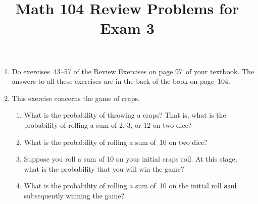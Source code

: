 \documentclass[12pt]{article}
\author{}\date{}
\title{Math 104 Review Problems for Exam 3}\author{}
\begin{document}
\maketitle
\pagestyle{empty}
\begin{enumerate}
\item Do exercises~43--57 of the Review Exercises
on page 97~of your textbook.
The answers to all these exercises are in the
back of the book on page~104.

\item This exercise concerns the game of craps.
\begin{enumerate}
\item What is the probability of throwing a craps? That is, what is
the probability of rolling a sum of 2, 3, or 12 on two dice?
\item What is the probability of rolling a sum of~10 on two dice?
\item Suppose you roll a sum of 10 on your initial craps roll.
At this stage, what is the probability that you will win the game?
\item What is the probability of rolling a sum of~10 on the initial
roll {\bf and} subsequently winning the game?
\end{enumerate}
\end{enumerate}
\end{document}
